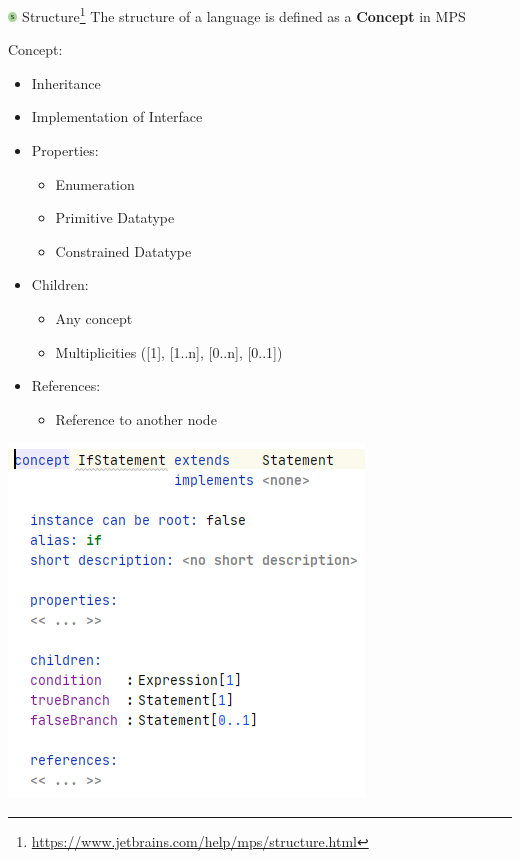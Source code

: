 	\begin{frame}{\includegraphics[height=0.25cm]{graphics/concept.png}  Structure\footnote{\url{https://www.jetbrains.com/help/mps/structure.html}}}
		The structure of a language is defined as a \textbf{Concept} in MPS\\
		\begin{minipage}{0.52\textwidth}
			Concept:
			\begin{itemize}
				\item Inheritance
				\item Implementation of Interface
				\item Properties:
				\begin{itemize}
					\item Enumeration
					\item Primitive Datatype
					\item Constrained Datatype
				\end{itemize}
				\item Children:
				\begin{itemize}
					\item Any concept 
					\item Multiplicities ([1], [1..n], [0..n], [0..1])
				\end{itemize}
				\item References:
				\begin{itemize}
					\item Reference to another node
				\end{itemize}
			\end{itemize}
		\end{minipage}
		\begin{minipage}{0.4\textwidth}
			\includegraphics[height=0.8\textheight]{illustrations/concept.png}
		\end{minipage}
	\end{frame}

